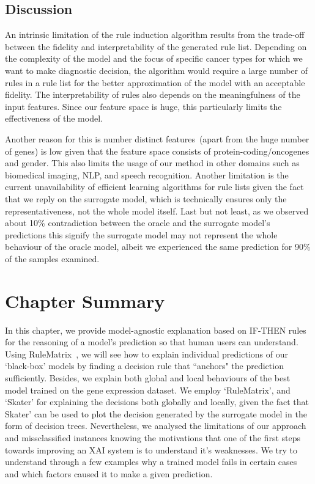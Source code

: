 \subsection{Discussion} \label{chapter_8:discussion}
An intrinsic limitation of the rule induction algorithm results from the trade-off between the fidelity and interpretability of the generated rule list. Depending on the complexity of the model and the focus of specific cancer types for which we want to make diagnostic decision, the algorithm would require a large number of rules in a rule list for the better  approximation of the model with an acceptable fidelity. The interpretability of rules also depends on the meaningfulness of the input features. Since our feature space is huge, this particularly limits the effectiveness of the model. 

\hspace*{3.5mm} Another reason for this is number distinct features~(apart from the huge number of genes) is low given that the feature space consists of protein-coding/oncogenes and gender. This also limits the usage of our method in other domains such as biomedical imaging, NLP, and speech recognition. Another limitation is the current unavailability of efficient learning algorithms for rule lists given the fact that we reply on the surrogate model, which is technically ensures only the representativeness, not the whole model itself. Last but not least, as we observed about 10\% contradiction between the oracle and the surrogate model's predictions this signify the surrogate model may not represent the whole behaviour of the oracle model, albeit we experienced the same prediction for 90\% of the samples examined. 

\section{Chapter Summary} \label{chapter_7:conclusion}
In this chapter, we provide model-agnostic explanation based on IF-THEN rules for the reasoning of a model's prediction so that human users can understand. %
Using RuleMatrix~\cite{ming2018rulematrix}, we will see how to explain individual predictions of our `black-box' models by finding a decision rule that ``anchors" the prediction sufficiently. Besides, we explain both global and local behaviours of the best model trained on the gene expression dataset. We employ `RuleMatrix', and `Skater' for explaining the decisions both globally and locally, given the fact that Skater' can be used to plot the decision generated by the surrogate model in the form of decision trees.  
Nevertheless, we analysed the limitations of our approach and missclassified instances knowing the motivations that one of the first steps towards improving an XAI system is to understand it’s weaknesses. We try to understand through a few examples why a trained model fails in certain cases and which factors caused it to make a given prediction. 

